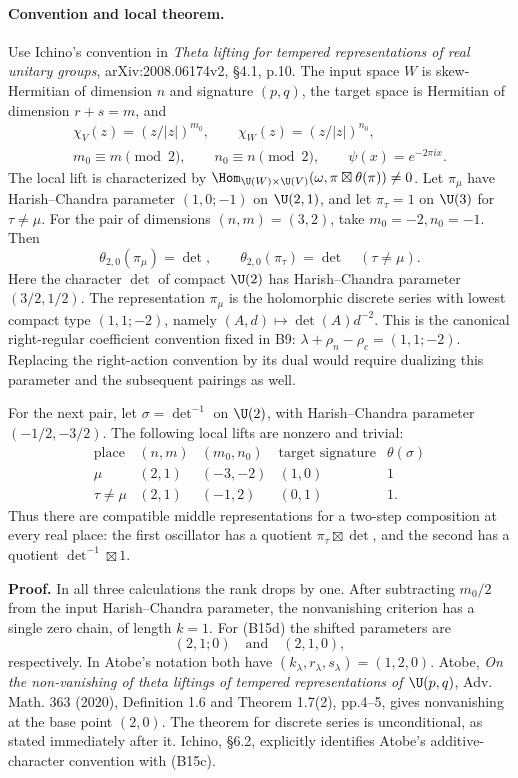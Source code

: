 \paragraph{Convention and local theorem.}
Use Ichino's convention in \emph{Theta lifting for tempered representations of real unitary groups}, arXiv:2008.06174v2, \S4.1, p.10. The input space $W$ is skew-Hermitian of dimension $n$ and signature $(p,q)$, the target space is Hermitian of dimension $r+s=m$, and
\begin{equation}
\begin{gathered}
 \chi_V(z)=(z/|z|)^{m_0},\qquad
 \chi_W(z)=(z/|z|)^{n_0},\\
 m_0\equiv m\pmod2,\qquad n_0\equiv n\pmod2,
 \qquad \psi(x)=e^{-2\pi i x}.
\end{gathered}
 \tag{B15c}
\end{equation}
The local lift is characterized by
$\Hom_{\U(W)\times\U(V)}(\omega,\pi\boxtimes\theta(\pi))\ne0$.
Let $\pi_\mu$ have Harish--Chandra parameter $(1,0;-1)$ on $\U(2,1)$, and let $\pi_\tau=1$ on $\U(3)$ for $\tau\ne\mu$. For the pair of dimensions $(n,m)=(3,2)$, take $m_0=-2,n_0=-1$. Then
\[
 \theta_{2,0}(\pi_\mu)=\det,\qquad
 \theta_{2,0}(\pi_\tau)=\det\quad(\tau\ne\mu).
 \tag{B15d}
\]
Here the character $\det$ of compact $\U(2)$ has Harish--Chandra parameter $(3/2,1/2)$.
The representation $\pi_\mu$ is the holomorphic discrete series with lowest compact type $(1,1;-2)$, namely $(A,d)\mapsto\det(A)d^{-2}$. This is the canonical right-regular coefficient convention fixed in B9: $\lambda+\rho_n-\rho_c=(1,1;-2)$. Replacing the right-action convention by its dual would require dualizing this parameter and the subsequent pairings as well.

For the next pair, let $\sigma=\det^{-1}$ on $\U(2)$, with Harish--Chandra parameter $(-1/2,-3/2)$. The following local lifts are nonzero and trivial:
\[
\begin{array}{c|c|c|c|c}
\text{place}&(n,m)&(m_0,n_0)&\text{target signature}&\theta(\sigma)\\ \hline
\mu&(2,1)&(-3,-2)&(1,0)&1\\
\tau\ne\mu&(2,1)&(-1,2)&(0,1)&1.
\end{array}
 \tag{B15e}
\]
Thus there are compatible middle representations for a two-step composition at every real place: the first oscillator has a quotient $\pi_\tau\boxtimes\det$, and the second has a quotient $\det^{-1}\boxtimes1$.

\textbf{Proof.}
In all three calculations the rank drops by one. After subtracting $m_0/2$ from the input Harish--Chandra parameter, the nonvanishing criterion has a single zero chain, of length $k=1$. For (B15d) the shifted parameters are
\[
 (2,1;0)\quad\text{and}\quad(2,1,0),
\]
respectively. In Atobe's notation both have $(k_\lambda,r_\lambda,s_\lambda)=(1,2,0)$. Atobe, \emph{On the non-vanishing of theta liftings of tempered representations of $\U(p,q)$}, Adv. Math. 363 (2020), Definition 1.6 and Theorem 1.7(2), pp.4--5, gives nonvanishing at the base point $(2,0)$. The theorem for discrete series is unconditional, as stated immediately after it. Ichino, \S6.2, explicitly identifies Atobe's additive-character convention with (B15c).


